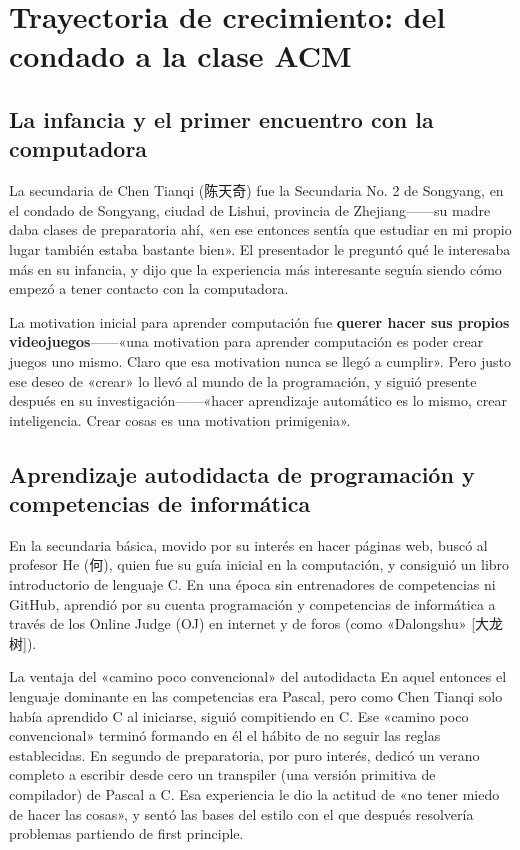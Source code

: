 \section{Trayectoria de crecimiento: del condado a la clase ACM}

\subsection{La infancia y el primer encuentro con la computadora}

La secundaria de Chen Tianqi (陈天奇) fue la Secundaria No. 2 de Songyang, en el condado de Songyang, ciudad de Lishui, provincia de Zhejiang------su madre daba clases de preparatoria ahí, «en ese entonces sentía que estudiar en mi propio lugar también estaba bastante bien». El presentador le preguntó qué le interesaba más en su infancia, y dijo que la experiencia más interesante seguía siendo cómo empezó a tener contacto con la computadora.

La motivation inicial para aprender computación fue \textbf{querer hacer sus propios videojuegos}------«una motivation para aprender computación es poder crear juegos uno mismo. Claro que esa motivation nunca se llegó a cumplir». Pero justo ese deseo de «crear» lo llevó al mundo de la programación, y siguió presente después en su investigación------«hacer aprendizaje automático es lo mismo, crear inteligencia. Crear cosas es una motivation primigenia».

\subsection{Aprendizaje autodidacta de programación y competencias de informática}

En la secundaria básica, movido por su interés en hacer páginas web, buscó al profesor He (何), quien fue su guía inicial en la computación, y consiguió un libro introductorio de lenguaje C. En una época sin entrenadores de competencias ni GitHub, aprendió por su cuenta programación y competencias de informática a través de los Online Judge (OJ) en internet y de foros (como «Dalongshu» [大龙树]).

\begin{knowledgebox}{La ventaja del «camino poco convencional» del autodidacta}
En aquel entonces el lenguaje dominante en las competencias era Pascal, pero como Chen Tianqi solo había aprendido C al iniciarse, siguió compitiendo en C. Ese «camino poco convencional» terminó formando en él el hábito de no seguir las reglas establecidas. En segundo de preparatoria, por puro interés, dedicó un verano completo a escribir desde cero un transpiler (una versión primitiva de compilador) de Pascal a C. Esa experiencia le dio la actitud de «no tener miedo de hacer las cosas», y sentó las bases del estilo con el que después resolvería problemas partiendo de first principle.
\end{knowledgebox}

